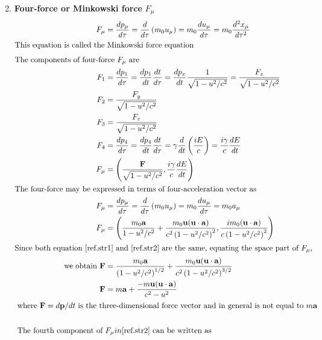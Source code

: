 \begin{enumerate}
\begin{align*}
	\end{align*}
	\item \textbf { Four-force or Minkowski force } $F_{\mu}$\\
	\begin{align}
	F_{\mu}&=\frac{d p_{\mu}}{d \tau}=\frac{d}{d \tau}\left(m_{0} u_{\mu}\right)=m_{0} \frac{d u_{\mu}}{d \tau}=m_{0} \frac{d^{2} x_{\mu}}{d \tau^{2}} \notag\\
	\intertext{This equation is called the Minkowski force equation}
	\intertext{The components of four-force $F_{\mu}$ are}
	F_{1}&=\frac{d p_{1}}{d \tau}=\frac{d p_{1}}{d t} \frac{d t}{d \tau}=\frac{d p_{x}}{d t} \frac{1}{\sqrt{1-u^{2} / c^{2}}}=\frac{F_{x}}{\sqrt{1-u^{2} / c^{2}}}\notag \\
	F_{2}&=\frac{F_{y}}{\sqrt{1-u^{2} / c^{2}}} \notag\\
	F_{3}&=\frac{F_{z}}{\sqrt{1-u^{2} / c^{2}}} \notag\\
	F_{4}&=\frac{d p_{4}}{d \tau}=\frac{d p_{4}}{d t} \frac{d t}{d \tau}=\gamma \frac{d}{d t}\left(\frac{i E}{c}\right)=\frac{i \gamma}{c} \frac{d E}{d t} \notag\\
	F_{\mu}&=\left(\frac{\mathbf{F}}{\sqrt{1-u^{2} / c^{2}}}, \frac{i \gamma}{c} \frac{d E}{d t}\right) \label{ref.str1}\\
	\intertext{The four-force may be expressed in terms of four-acceleration vector as}
	F_{\mu}&=\frac{d p_{\mu}}{d \tau}=\frac{d}{d \tau}\left(m_{0} u_{\mu}\right)=m_{0} \frac{d u_{\mu}}{d \tau}=m_{0} a_{\mu}\notag\\
	F_{\mu}&=\left(\frac{m_{0} \mathbf{a}}{1-u^{2} / c^{2}}+\frac{m_{0} \mathbf{u}(\mathbf{u} \cdot \mathbf{a})}{c^{2}\left(1-u^{2} / c^{2}\right)^{2}}, \frac{i m_{0}(\mathbf{u} \cdot \mathbf{a})}{c\left(1-u^{2} / c^{2}\right)^{2}}\right)\label{ref.str2}\\
	\intertext {Since both equation $\ref{ref.str1}$ and $\ref{ref.str2}$ are the same, equating the space part of $F_{\mu}$,}  \text { we obtain }
	\mathbf{F}&=\frac{m_{0} \mathbf{a}}{\left(1-u^{2} / c^{2}\right)^{1 / 2}}+\frac{m_{0} \mathbf{u}(\mathbf{u} \cdot \mathbf{a})}{c^{2}\left(1-u^{2} / c^{2}\right)^{3 / 2}} \label{ref.str3}\\
	\mathbf{F}&=m \mathbf{a}+\frac{-m \mathbf{u}(\mathbf{u} \cdot \mathbf{a})}{c^{2}-u^{2}} \notag\\
	\intertext { where $\mathbf{F}=d \mathbf{p} / d t$  is the three-dimensional force vector and in general is not equal to $ m \mathbf{a}$} \notag\\
	\text { The fourth component of } &F_{\mu} in \ref{ref.str2} \text { can be written as }\notag \\

\end{align}
\end{enumerate}
